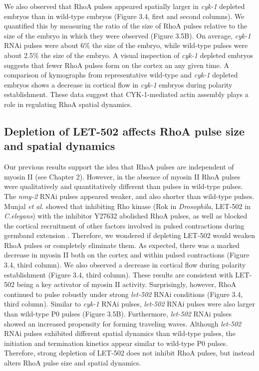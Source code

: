 \documentclass{ucetd}
\begin{document}
We also observed that RhoA pulses appeared spatially larger in \textit{cyk-1} depleted embryos than in wild-type embryos (Figure 3.4, first and second  columns).  We quantified this by measuring the ratio of the size of RhoA pulses relative to the size of the embryo in which they were observed (Figure 3.5B).  On average, \textit{cyk-1} RNAi pulses were about 6$\%$ the size of the embryo, while wild-type pulses were about 2.5$\%$ the size of the embryo.  A visual inspection of \textit{cyk-1} depleted embryos suggests that fewer RhoA pulses form on the cortex an any given time.  A comparison of kymographs from representative wild-type and \textit{cyk-1} depleted embryos shows a decrease in cortical flow in \textit{cyk-1} embryos during polarity establishment.  These data suggest that CYK-1-mediated actin assembly plays a role in regulating RhoA spatial dynamics.

\subsection{Depletion of LET-502 affects RhoA pulse size and spatial dynamics}
Our previous results support the idea that RhoA pulses are independent of myosin II (see Chapter 2).  However, in the absence of myosin II RhoA pulses were qualitatively and quantitatively different than pulses in wild-type pulses.  The \textit{nmy-2} RNAi pulses appeared weaker, and also shorter than wild-type pulses.  Munjal \textit{et al.} showed that inhibiting Rho kinase (Rok in \textit{Drosophila}, LET-502 in \textit{C.elegans}) with the inhibitor Y27632 abolished RhoA pulses, as well as blocked the cortical recruitment of other factors involved in pulsed contractions during germband extension \cite{Munjal:2015bx}.  Therefore, we wondered if depleting LET-502 would weaken RhoA pulses or completely eliminate them.  As expected, there was a marked decrease in myosin II both on the cortex and within pulsed contractions (Figure 3.4, third column).  We also observed a decrease in cortical flow during polarity establishment (Figure 3.4, third column).  These results are consistent with LET-502 being a key activator of myosin II activity.  Surprisingly, however,  RhoA continued to pulse robustly under strong \textit{let-502} RNAi conditions (Figure 3.4, third column).  Similar to \textit{cyk-1} RNAi pulses, \textit{let-502} RNAi pulses were also larger than wild-type P0 pulses (Figure 3.5B).  Furthermore, \textit{let-502} RNAi pulses showed an increased propensity for forming traveling waves.  Although \textit{let-502} RNAi pulses exhibited different spatial dynamics than wild-type pulses, the initiation and termination kinetics appear similar to wild-type P0 pulses.  Therefore, strong depletion of LET-502 does not inhibit RhoA pulses, but instead alters RhoA pulse size and spatial dynamics.
\end{document}

